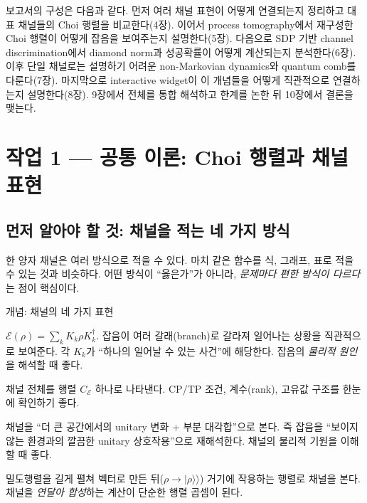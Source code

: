 \documentclass[11pt,a4paper]{article}
\newcommand{\E}{\mathcal{E}}
\begin{document}
보고서의 구성은 다음과 같다. 먼저 여러 채널 표현이 어떻게 연결되는지 정리하고 대표 채널들의 Choi 행렬을 비교한다(4장). 이어서 process tomography에서 재구성한 Choi 행렬이 어떻게 잡음을 보여주는지 설명한다(5장). 다음으로 SDP 기반 channel discrimination에서 diamond norm과 성공확률이 어떻게 계산되는지 분석한다(6장). 이후 단일 채널로는 설명하기 어려운 non-Markovian dynamics와 quantum comb를 다룬다(7장). 마지막으로 interactive widget이 이 개념들을 어떻게 직관적으로 연결하는지 설명한다(8장). 9장에서 전체를 통합 해석하고 한계를 논한 뒤 10장에서 결론을 맺는다.

\section{작업 1 --- 공통 이론: Choi 행렬과 채널 표현}

\subsection{먼저 알아야 할 것: 채널을 적는 네 가지 방식}

한 양자 채널은 여러 방식으로 적을 수 있다. 마치 같은 함수를 식, 그래프, 표로 적을 수 있는 것과 비슷하다. 어떤 방식이 ``옳은가''가 아니라, \emph{문제마다 편한 방식이 다르다}는 점이 핵심이다.

\begin{conceptbox}{개념: 채널의 네 가지 표현}
\begin{description}[leftmargin=1.5em,style=nextline]
  \item[Kraus 표현] $\E(\rho)=\sum_k K_k\rho K_k^\dagger$. 잡음이 여러 갈래(branch)로 갈라져 일어나는 상황을 직관적으로 보여준다. 각 $K_k$가 ``하나의 일어날 수 있는 사건''에 해당한다. 잡음의 \emph{물리적 원인}을 해석할 때 좋다.
  \item[Choi 표현] 채널 전체를 행렬 $C_\E$ 하나로 나타낸다. CP/TP 조건, 계수(rank), 고유값 구조를 한눈에 확인하기 좋다.
  \item[Stinespring 표현] 채널을 ``더 큰 공간에서의 unitary 변화 + 부분 대각합''으로 본다. 즉 잡음을 ``보이지 않는 환경과의 깔끔한 unitary 상호작용''으로 재해석한다. 채널의 물리적 기원을 이해할 때 좋다.
  \item[Natural(Liouville) 표현] 밀도행렬을 길게 펼쳐 벡터로 만든 뒤($\rho\to|\rho\rangle\!\rangle$) 거기에 작용하는 행렬로 채널을 본다. 채널을 \emph{연달아 합성}하는 계산이 단순한 행렬 곱셈이 된다.
\end{description}
\end{conceptbox}
\end{document}
